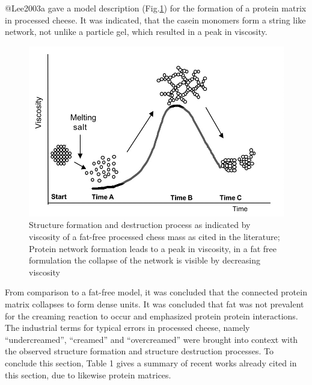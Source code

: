 \documentclass[
]{article}
\begin{document}
@Lee2003a gave a model description (Fig.\ref{fig:Lee}) for the formation
of a protein matrix in processed cheese. It was indicated, that the
casein monomers form a string like network, not unlike a particle gel,
which resulted in a peak in viscosity.

\begin{figure}
\includegraphics[width=0.5\linewidth]{images/str.frm_Lee} \caption[Structure formation of a fat-free processed cheese as in Lee et al. (2003)]{Structure formation and destruction process as indicated by viscosity of a fat-free processed chess mass as cited in the literature; Protein network formation leads to a peak in viscosity, in a fat free formulation the collapse of the network is visible by decreasing viscosity}\label{fig:Lee}
\end{figure}

From comparison to a fat-free model, it was concluded that the connected
protein matrix collapses to form dense units. It was concluded that fat
was not prevalent for the creaming reaction to occur and emphasized
protein protein interactions. The industrial terms for typical errors in
processed cheese, namely ``undercreamed'', ``creamed'' and
``overcreamed'' were brought into context with the observed structure
formation and structure destruction processes. To conclude this section,
Table 1 gives a summary of recent works already cited in this section,
due to likewise protein matrices.
\end{document}
